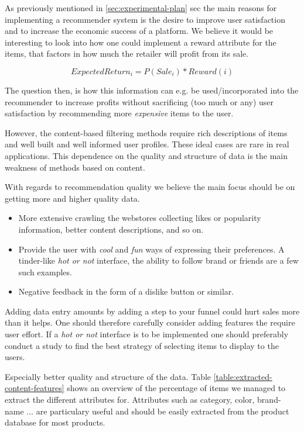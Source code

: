 As previously mentioned in \ref{sec:experimental-plan} sec the main reasons for implementing a recommender
system is the desire to improve user satisfaction and to increase the economic success of a platform.
We believe it would be interesting to look into how one could implement a reward attribute for the
items, that factors in how much the retailer will profit from its sale.

\begin{equation}
ExpectedReturn_i = P(Sale_i) * Reward(i)
\end{equation}

The question then, is how this information can e.g. be used/incorporated into the recommender to
increase profits without sacrificing (too much or any) user satisfaction by recommending
more \emph{expensive} items to the user.


However, the content-based filtering methods require rich descriptions of items and well built
and well informed user profiles. These ideal cases are rare in real applications. This dependence
on the quality and structure of data is the main weakness of methods based on content.


With regards to recommendation quality we believe the main focus should be on getting more
and higher quality data.

\begin{itemize}
\item More extensive crawling the webstores collecting likes or popularity information, better content descriptions,
	  and so on.
\item Provide the user with \emph{cool} and \emph{fun} ways of expressing their preferences. A tinder-like \emph{hot or not}
	  interface, the ability to follow brand or friends are a few such examples.
\item Negative feedback in the form of a dislike button or similar.
\end{itemize}

Adding data entry amounts by adding a step to your funnel could hurt sales more than it helps. One should
therefore carefully consider adding features the require user effort. If a \emph{hot or not} interface is to be implemented
one should preferably conduct a study to find the best strategy of selecting items to display to the users.

Especially better quality and structure of the data. Table \ref{table:extracted-content-features} shows an overview of
the percentage of items we managed to extract the different attributes for. Attributes such as category, color, brand-name ...
are particulary useful and should be easily extracted from the product database for most products.

